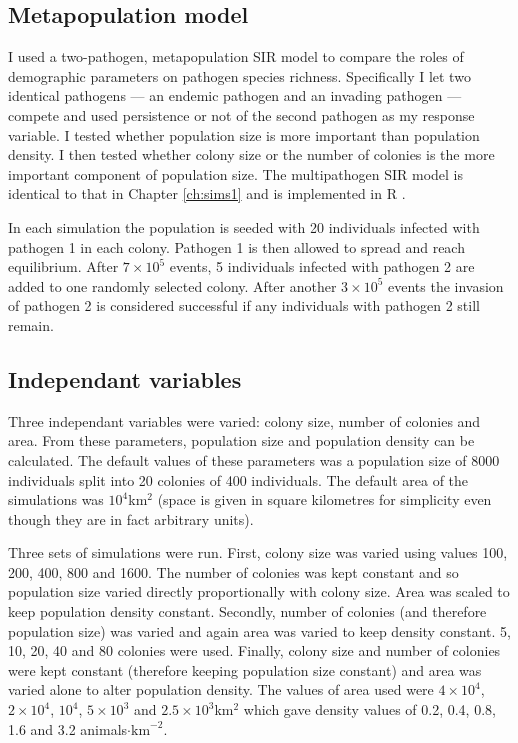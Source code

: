 \subsection{Metapopulation model}



I used a two-pathogen, metapopulation SIR model to compare the roles of demographic parameters on pathogen species richness.
Specifically I let two identical pathogens --- an endemic pathogen and an invading pathogen --- compete and used persistence or not of the second pathogen as my response variable.
I tested whether population size is more important than population density.
I then tested whether colony size or the number of colonies is the more important component of population size.
The multipathogen SIR model is identical to that in Chapter \ref{ch:sims1} and is implemented in R \cite{R}.



In each simulation the population is seeded with 20 individuals infected with pathogen 1 in each colony. 
Pathogen 1 is then allowed to spread and reach equilibrium. 
After \ensuremath{7\times 10^{5}} events, 5 individuals infected with pathogen 2 are added to one randomly selected colony. 
After another \ensuremath{3\times 10^{5}} events the invasion of pathogen 2 is considered successful if any individuals with pathogen 2 still remain.

\subsection{Independant variables}

Three independant variables were varied: colony size, number of colonies and area.
From these parameters, population size and population density can be calculated.
The default values of these parameters was a population size of 8000 individuals split into 20 colonies of 400 individuals.
The default area of the simulations was \ensuremath{10^{4}}km$^2$ (space is given in square kilometres for simplicity even though they are in fact arbitrary units).

Three sets of simulations were run.
First, colony size was varied using values 100, 200, 400, 800 and 1600.
The number of colonies was kept constant and so population size varied directly proportionally with colony size.
Area was scaled to keep population density constant. 
Secondly, number of colonies (and therefore population size) was varied and again area was varied to keep density constant.
5, 10, 20, 40 and 80 colonies were used.
Finally, colony size and number of colonies were kept constant (therefore keeping population size constant) and area was varied alone to alter population density. 
The values of area used were \ensuremath{4\times 10^{4}}, \ensuremath{2\times 10^{4}}, \ensuremath{10^{4}}, \ensuremath{5\times 10^{3}} and \ensuremath{2.5\times 10^{3}}km$^2$ which gave density values of 0.2, 0.4, 0.8, 1.6 and 3.2 animals$\cdot\text{km}^{-2}$.

